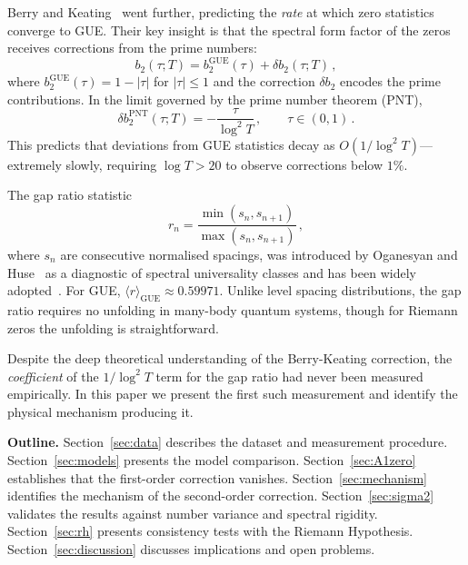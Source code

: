 \documentclass[11pt]{article}
\theoremstyle{plain}
\theoremstyle{remark}
\begin{document}
Berry and Keating~\cite{berry1999, bogomolny1996} went further, predicting
the \emph{rate} at which zero statistics converge to GUE. Their key insight
is that the spectral form factor of the zeros receives corrections from the
prime numbers:
\begin{equation}
b_2(\tau; T) = b_2^{\mathrm{GUE}}(\tau) + \delta b_2(\tau; T)\,,
\label{eq:formfactor}
\end{equation}
where $b_2^{\mathrm{GUE}}(\tau) = 1 - |\tau|$ for $|\tau| \leq 1$ and
the correction $\delta b_2$ encodes the prime contributions. In the limit
governed by the prime number theorem (PNT),
\begin{equation}
\delta b_2^{\mathrm{PNT}}(\tau; T) = -\frac{\tau}{\log^2 T}\,,
\qquad \tau \in (0,1)\,.
\label{eq:db2pnt}
\end{equation}
This predicts that deviations from GUE statistics decay as
$O(1/\log^2 T)$---extremely slowly, requiring $\log T > 20$
to observe corrections below $1\%$.

The gap ratio statistic
\begin{equation}
r_n = \frac{\min(s_n, s_{n+1})}{\max(s_n, s_{n+1})}\,,
\label{eq:ratio}
\end{equation}
where $s_n$ are consecutive normalised spacings, was introduced by
Oganesyan and Huse~\cite{oganesyan2007} as a diagnostic of spectral
universality classes and has been widely adopted~\cite{atas2013}.
For GUE, $\langle r\rangle_{\mathrm{GUE}} \approx 0.59971$.
Unlike level spacing distributions, the gap ratio requires no unfolding
in many-body quantum systems, though for Riemann zeros the unfolding
is straightforward.

Despite the deep theoretical understanding of the Berry-Keating correction,
the \emph{coefficient} of the $1/\log^2 T$ term for the gap ratio had
never been measured empirically. In this paper we present the first such
measurement and identify the physical mechanism producing it.

\medskip\noindent
\textbf{Outline.} Section~\ref{sec:data} describes the dataset and
measurement procedure. Section~\ref{sec:models} presents the model
comparison. Section~\ref{sec:A1zero} establishes that the first-order
correction vanishes. Section~\ref{sec:mechanism} identifies the mechanism
of the second-order correction. Section~\ref{sec:sigma2} validates the
results against number variance and spectral rigidity. Section~\ref{sec:rh}
presents consistency tests with the Riemann Hypothesis.
Section~\ref{sec:discussion} discusses implications and open problems.
\end{document}
